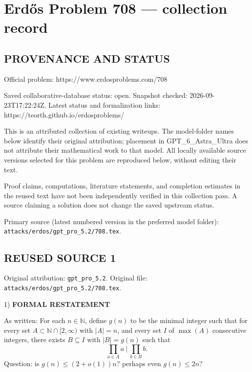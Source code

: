\section*{Erd\H{o}s Problem 708 --- collection record}

\subsection*{PROVENANCE AND STATUS}
Official problem: https://www.erdosproblems.com/708

Saved collaborative-database status: open.
Snapshot checked: 2026-09-23T17:22:24Z.
Latest status and formalization links: https://teorth.github.io/erdosproblems/

This is an attributed collection of existing writeups. The model-folder names below identify their original attribution; placement in GPT\_6\_Astra\_Ultra does not attribute their mathematical work to that model. All locally available source versions selected for this problem are reproduced below, without editing their text.

Proof claims, computations, literature statements, and completion estimates in the reused text have not been independently verified in this collection pass. A source claiming a solution does not change the saved upstream status.

Primary source (latest numbered version in the preferred model folder): \texttt{attacks/erdos/gpt\_pro\_5.2/708.tex}.

\subsection*{REUSED SOURCE 1}
Original attribution: \texttt{gpt\_pro\_5.2}.
Original file: \texttt{attacks/erdos/gpt\_pro\_5.2/708.tex}.


1) \textbf{FORMAL RESTATEMENT}

As written:
For each $n\in\mathbb{N}$, define $g(n)$ to be the minimal integer such that for every set $A\subset\mathbb{N}\cap[2,\infty)$ with $|A|=n$, and every set $I$ of $\max(A)$ consecutive integers, there exists $B\subseteq I$ with $|B|=g(n)$ such that
\[
\prod_{a\in A} a\ \big|\ \prod_{b\in B} b.
\]
Question: is $g(n)\le (2+o(1))n$? perhaps even $g(n)\le 2n$?

